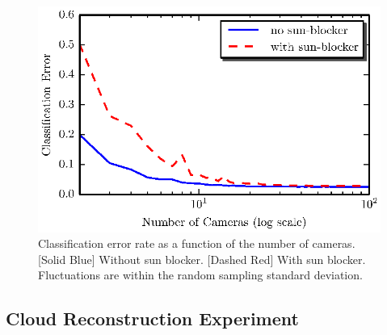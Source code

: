 \documentclass[runningheads]{llncs}
\begin{document}
\begin{figure}
  \begin{center}
    \includegraphics{figures/simulations.eps}
    \caption{Classification error rate as a function of the number of
    cameras. [Solid Blue] Without sun blocker. [Dashed Red] With sun blocker.
    Fluctuations are within the random sampling standard deviation.}
    \label{fig:simulations}
  \end{center}
\end{figure}


\subsection*{Cloud Reconstruction Experiment}
\label{sec:results}
\end{document}
